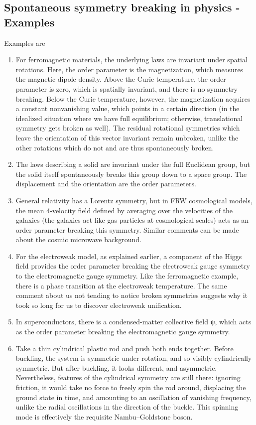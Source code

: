 \subsection{Spontaneous symmetry breaking in physics - Examples}
Examples are
\begin{enumerate}
\item 	For ferromagnetic materials, the underlying laws are invariant under spatial rotations. Here, the order parameter is the magnetization, which measures the magnetic dipole density. Above the Curie temperature, the order parameter is zero, which is spatially invariant, and there is no symmetry breaking. Below the Curie temperature, however, the magnetization acquires a constant nonvanishing value, which points in a certain direction (in the idealized situation where we have full equilibrium; otherwise, translational symmetry gets broken as well). The residual rotational symmetries which leave the orientation of this vector invariant remain unbroken, unlike the other rotations which do not and are thus spontaneously broken.
	 \item The laws describing a solid are invariant under the full Euclidean group, but the solid itself spontaneously breaks this group down to a space group. The displacement and the orientation are the order parameters.
	\item General relativity has a Lorentz symmetry, but in FRW cosmological models, the mean 4-velocity field defined by averaging over the velocities of the galaxies (the galaxies act like gas particles at cosmological scales) acts as an order parameter breaking this symmetry. Similar comments can be made about the cosmic microwave background.
	\item For the electroweak model, as explained earlier, a component of the Higgs field provides the order parameter breaking the electroweak gauge symmetry to the electromagnetic gauge symmetry. Like the ferromagnetic example, there is a phase transition at the electroweak temperature. The same comment about us not tending to notice broken symmetries suggests why it took so long for us to discover electroweak unification.
	\item In superconductors, there is a condensed-matter collective field ψ, which acts as the order parameter breaking the electromagnetic gauge symmetry.
	\item Take a thin cylindrical plastic rod and push both ends together. Before buckling, the system is symmetric under rotation, and so visibly cylindrically symmetric. But after buckling, it looks different, and asymmetric. Nevertheless, features of the cylindrical symmetry are still there: ignoring friction, it would take no force to freely spin the rod around, displacing the ground state in time, and amounting to an oscillation of vanishing frequency, unlike the radial oscillations in the direction of the buckle. This spinning mode is effectively the requisite Nambu–Goldstone boson.

\end{enumerate}
